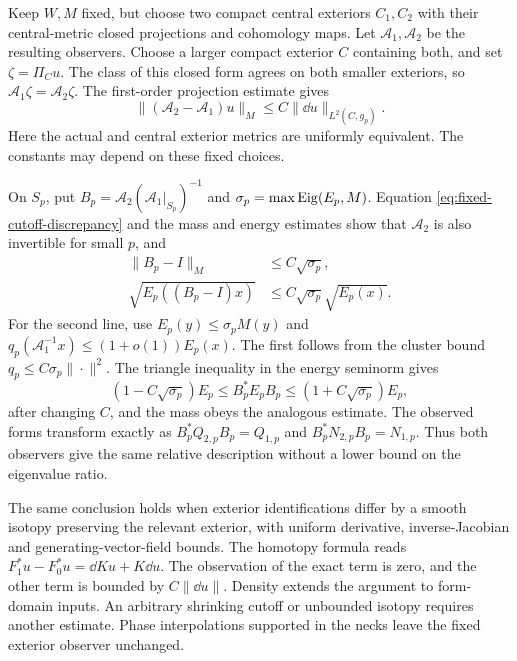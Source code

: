 Keep $W,M$ fixed, but choose two compact
central exteriors $C_1,C_2$ with their
central-metric closed projections and
cohomology maps. Let $\mathcal A_1,
\mathcal A_2$ be the resulting observers.
Choose a larger compact exterior $C$
containing both, and set $\zeta=\Pi_Cu$.
The class of this closed form agrees
on both smaller exteriors, so
$\mathcal A_1\zeta=\mathcal A_2\zeta$.
The first-order projection estimate gives
\begin{equation}\label{eq:fixed-cutoff-discrepancy}
 \|(\mathcal A_2-\mathcal A_1)u\|_M
       \le C\|\dd u\|_{L^2(C,g_p)}.
\end{equation}
Here the actual and central exterior
metrics are uniformly equivalent.
The constants may depend on these fixed
choices.

On $S_p$, put
$B_p=\mathcal A_2(\mathcal A_1|_{S_p})^{-1}$
and $\sigma_p=\max\operatorname{Eig}(E_p,M)$.
Equation \eqref{eq:fixed-cutoff-discrepancy}
and the mass and energy estimates show
that $\mathcal A_2$ is also invertible
for small $p$, and
\begin{equation}\label{eq:cutoff-relative-transport}
 \begin{aligned}
 \|B_p-I\|_M&\le C\sqrt{\sigma_p},\\
 \sqrt{E_p((B_p-I)x)}
       &\le C\sqrt{\sigma_p}\sqrt{E_p(x)}.
 \end{aligned}
\end{equation}
For the second line, use
$E_p(y)\le\sigma_pM(y)$ and
$q_p(\mathcal A_1^{-1}x)\le(1+o(1))E_p(x)$.
The first follows from the cluster bound
$q_p\le C\sigma_p\|\cdot\|^2$.
The triangle inequality in the energy
seminorm gives
\[
 (1-C\sqrt{\sigma_p})E_p
       \le B_p^*E_pB_p
       \le(1+C\sqrt{\sigma_p})E_p,
\]
after changing $C$, and the mass obeys
the analogous estimate. The observed
forms transform exactly as
$B_p^*Q_{2,p}B_p=Q_{1,p}$ and
$B_p^*N_{2,p}B_p=N_{1,p}$.
Thus both observers give the same
relative description without a
lower bound on the eigenvalue ratio.

The same conclusion holds when exterior
identifications differ by a smooth isotopy
preserving the relevant exterior, with
uniform derivative, inverse-Jacobian and
generating-vector-field bounds.
The homotopy formula reads
$F_1^*u-F_0^*u=\dd Ku+K\dd u$.
The observation of the exact term is
zero, and the other term is bounded
by $C\|\dd u\|$. Density extends the
argument to form-domain inputs.
An arbitrary shrinking cutoff or
unbounded isotopy requires another
estimate. Phase interpolations supported
in the necks leave the fixed exterior
observer unchanged.


